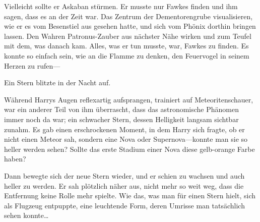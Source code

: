 Vielleicht sollte er Askaban stürmen. Er musste nur Fawkes finden und ihm sagen, dass es an der Zeit war. Das Zentrum der Dementorengrube visualisieren, wie er es vom Besenstiel aus gesehen hatte, und sich vom Phönix dorthin bringen lassen. Den Wahren Patronus-Zauber aus nächster Nähe wirken und zum Teufel mit dem, was danach kam.
Alles, was er tun musste, war, Fawkes zu finden.
Es konnte so einfach sein, wie an die Flamme zu denken, den Feuervogel in seinem Herzen zu rufen—

Ein Stern blitzte in der Nacht auf.

Während Harrys Augen reflexartig aufsprangen, trainiert auf Meteoritenschauer, war ein anderer Teil von ihm überrascht, dass das astronomische Phänomen immer noch da war; ein schwacher Stern, dessen Helligkeit langsam sichtbar zunahm. Es gab einen erschrockenen Moment, in dem Harry sich fragte, ob er nicht einen Meteor sah, sondern eine Nova oder Supernova—konnte man sie so heller werden sehen? Sollte das erste Stadium einer Nova diese gelb-orange Farbe haben?

Dann bewegte sich der neue Stern wieder, und er schien zu wachsen und auch heller zu werden. Er sah plötzlich näher aus, nicht mehr so weit weg, dass die Entfernung keine Rolle mehr spielte. Wie das, was man für einen Stern hielt, sich als Flugzeug entpuppte, eine leuchtende Form, deren Umrisse man tatsächlich sehen konnte…

